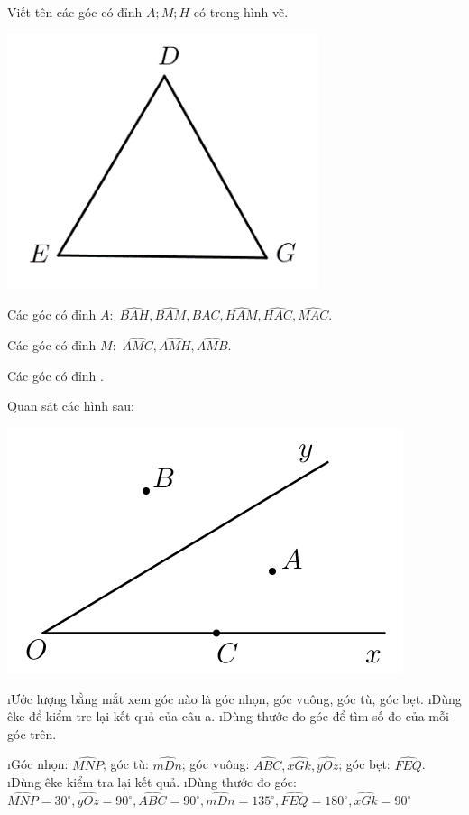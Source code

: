 \begin{bt}%
	Viết tên các góc có đỉnh $A;M;H$ có trong hình vẽ.
	\begin{center}
		\includegraphics[width= 0.5\linewidth]{vd-30-11}
	\end{center}
	\begin{loigiaichuong30}
		Các góc có đỉnh $A:\,\,\widehat{BAH},\widehat{BAM},\widehat{BAC},\widehat{HAM},\widehat{HAC},\widehat{MAC}$.
		
		Các góc có đỉnh $M:\,\,\widehat{AMC},\widehat{AMH},\widehat{AMB}$.
		
		Các góc có đỉnh .
	\end{loigiaichuong30}
\end{bt}
\begin{bt}
	Quan sát các hình sau:
	\begin{center}
		\includegraphics[width= 0.5\linewidth]{vd-30-12}
	\end{center}
	\begin{enumerate}[a),leftmargin=*]
		\i Ước lượng bằng mắt xem góc nào là góc nhọn, góc vuông, góc tù, góc bẹt.
		\i Dùng êke để kiểm tre lại kết quả của câu a.
		\i Dùng thước đo góc để tìm số đo của mỗi góc trên.
	\end{enumerate}
	\begin{loigiaichuong30}
		\begin{enumerate}[a),leftmargin=*]
			\i Góc nhọn: $\widehat{MNP}$; góc tù: $\widehat{mDn}$; góc vuông: $\widehat{ABC},\widehat{xGk},\widehat{yOz}$; góc bẹt: $\widehat{FEQ}$.
			\i Dùng êke kiểm tra lại kết quả.
			\i Dùng thước đo góc: $\widehat{MNP}={{30}^\circ},\widehat{yOz}={{90}^\circ},\widehat{ABC}={{90}^\circ},\widehat{mDn}={{135}^\circ},\widehat{FEQ}={{180}^\circ},\widehat{xGk}={{90}^\circ}$
		\end{enumerate}
	\end{loigiaichuong30}
\end{bt}

